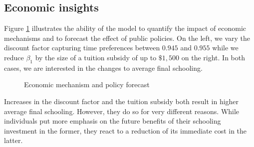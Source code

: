 \subsection{Economic insights}
Figure \ref{Economic mechanism and policy forecast} illustrates the ability of the model to quantify the impact of economic mechanisms and to forecast the effect of public policies. On the left, we vary the discount factor capturing time preferences between $0.945$ and $0.955$ while we reduce $\beta_1$ by the size of a tuition subsidy of up to $\$1,500$ on the right. In both cases, we are interested in the changes to average final schooling.

\begin{figure}[h!]\centering
\caption{Economic mechanism and policy forecast}\label{Economic mechanism and policy forecast}
\hspace{0.3cm}
\end{figure}\FloatBarrier

\noindent Increases in the discount factor and the tuition subsidy both result in higher average final schooling. However, they do so for very different reasons. While individuals put more emphasis on the future benefits of their schooling investment in the former, they react to a reduction of its immediate cost in the latter.
